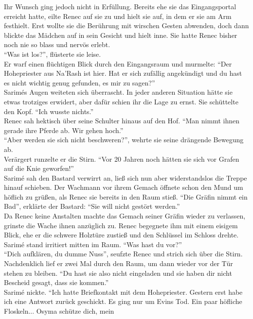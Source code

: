 Ihr Wunsch ging jedoch nicht in Erfüllung. Bereits ehe sie das Eingangsportal erreicht hatte, eilte 
Renec auf sie zu und hielt sie auf, in dem er sie am Arm festhielt. Erst wollte sie die Berührung 
mit wirschen Gesten abwenden, doch dann blickte das Mädchen auf in sein Gesicht und hielt inne. Sie 
hatte Renec bisher noch nie so blass und nervös erlebt. \\
``Was ist los?'', flüsterte sie leise.\\
Er warf einen flüchtigen Blick durch den Eingangsraum und murmelte: ``Der Hohepriester aus Na'Rash 
ist hier. Hat er sich zufällig angekündigt und du hast es nicht wichtig genug gefunden, es mir zu 
sagen?''\\
Sarimés Augen weiteten sich überrascht. In jeder anderen Situation hätte sie etwas trotziges 
erwidert, aber dafür schien ihr die Lage zu ernst. Sie schüttelte den Kopf. ``Ich wusste 
nichts.''\\
Renec sah hektisch über seine Schulter hinaus auf den Hof. ``Man nimmt ihnen gerade ihre Pferde ab. 
Wir gehen hoch.''\\
``Aber werden sie sich nicht beschweren?'', wehrte sie seine drängende Bewegung ab.\\
Verärgert runzelte er die Stirn. ``Vor 20 Jahren noch hätten sie sich vor Grafen auf die Knie 
geworfen!''\\
Sarimé sah den Bastard verwirrt an, ließ sich nun aber widerstandslos die Treppe hinauf schieben. 
Der Wachmann vor ihrem Gemach öffnete schon den Mund um höflich zu grüßen, als Renec sie bereits 
in den Raum stieß. ``Die Gräfin nimmt ein Bad'', erklärte der Bastard: 
``Sie will nicht gestört werden.''\\
Da Renec keine Anstalten machte das Gemach seiner Gräfin wieder zu verlassen, grinste die Wache 
ihnen anzüglich zu. Renec begegnete ihm mit einem eisigem Blick, ehe er die schwere Holztüre zustieß 
und den Schlüssel im Schloss drehte. \\
Sarimé stand irritiert mitten im Raum. ``Was hast du vor?''\\
``Dich aufklären, du dumme Nuss'', seufzte Renec und strich sich über die Stirn. Nachdenklich lief 
er zwei Mal durch den Raum, um dann wieder vor der Tür stehen zu bleiben. ``Du hast sie also nicht 
eingeladen und sie haben dir nicht Bescheid gesagt, dass sie kommen.''\\
Sarimé nickte. ``Ich hatte Briefkontakt mit dem Hohepriester. Gestern erst habe ich eine Antwort 
zurück geschickt. Es ging nur um Evins Tod. Ein paar höfliche Floskeln... Osyma schütze dich, mein 
